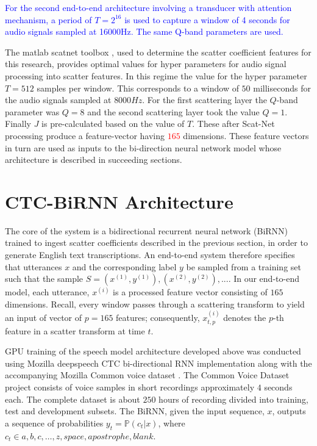 \textcolor{blue}{For the second end-to-end architecture involving a transducer with attention mechanism, a period of $T=2^{16}$ is used to capture a window of 4 seconds for audio signals sampled at 16000Hz. The same Q-band parameters are used.}

The matlab scatnet toolbox \citep{anden2014scatnet}, used to determine the scatter coefficient features for this research, provides optimal values for hyper parameters for audio signal processing into scatter features.  In this regime the value for the hyper parameter $T=512$ samples per window. This corresponds to a window of $50$ milliseconds for the audio signals sampled at $8000 Hz$.  For the first scattering layer the $Q$-band parameter was $Q=8$ and the second scattering layer took the value  $Q=1$.  Finally $J$ is pre-calculated based on the value of $T$.  These after Scat-Net processing produce a feature-vector having \textcolor{red}{$165$}  dimensions.  These feature vectors in turn are used as inputs to the bi-direction neural network model whose architecture is described in  succeeding sections.

\section{CTC-BiRNN Architecture}
The core of the system is a bidirectional recurrent neural network (BiRNN) trained to ingest scatter coefficients described in the previous section, in order to generate English text transcriptions.  An end-to-end system therefore specifies that utterances $x$ and the corresponding label $y$ be sampled from a training set such that the sample $S = {(x^{(1)}, y^{(1)}), (x^{(2)}, y^{(2)}), . . .}$.   In our end-to-end model, each utterance, $x^{(i)}$ is a processed feature vector consisting of $165$ dimensions.  Recall, every window passes through a scattering transform to yield an input of vector of $p=165$ features; consequently,   $x^{(i)}_{t,p}$ denotes the $p$-th feature in a scatter transform at time $t$.  

GPU training of the speech model architecture developed above was conducted using Mozilla deepspeech \citep{mozilla/deepspeech_2019} CTC bi-directional RNN implementation along with the accompanying Mozilla Common voice dataset  \citep{mozilla_2019}.  The Common Voice Dataset project consists of voice samples in short recordings approximately $4$ seconds each.  The complete dataset is about $250$ hours of recording divided into training, test and development subsets.  The BiRNN, given the input sequence, $x$, outputs a sequence of probabilities $y_t=\mathbb{P}(c_t|x)$,  where $c_t \in a,b,c,\dots,z,space,apostrophe,blank$. 

